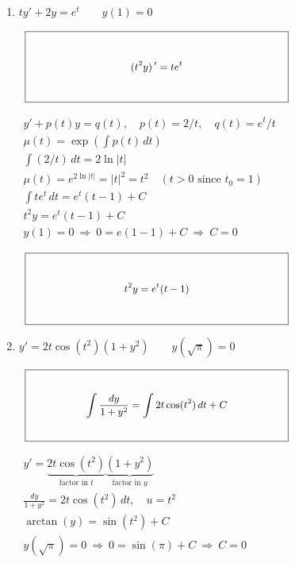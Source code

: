 \documentclass[12pt,letterpaper]{article}
\newcommand{\KeyBox}[3]{%
  \vcenter{\hbox{$\boxed{\parbox[c][#2][c]{#1}{\centering\small
    \setlength{\arraycolsep}{3pt}\renewcommand{\arraystretch}{0.95}%
    \ensuremath{\displaystyle #3}}}$}}}
\begin{document}
\noindent{}%

\begin{enumerate}
\item {}\qquad $ty'+2y=e^t\qquad y(1)=0$

\par\noindent{}\ $\KeyBox{3.2in}{0.80in}{(t^2y)\,{}^{\prime}=t e^t}$\par
{}

\hfill{\footnotesize $\begin{gathered}
y'+p(t)y=q(t),\quad p(t)=2/t,\quad q(t)=e^t/t\\
\mu(t)=\exp\!\left(\int p(t)\,dt\right)\\
\int (2/t)\,dt=2\ln|t|\\
\mu(t)=e^{2\ln|t|}=|t|^2=t^2\quad(t>0\text{ since }t_0=1)\\
\int t e^t\,dt=e^t(t-1)+C\\
t^2y=e^t(t-1)+C\\
y(1)=0\ \Longrightarrow\ 0=e(1-1)+C\ \Longrightarrow\ C=0
\end{gathered}$}
\vfill

\noindent{}\ $\KeyBox{3.2in}{0.80in}{t^2y=e^t(t-1)}$\par
\item {}\qquad $y'=2t\cos(t^2)(1+y^2)\qquad y(\sqrt{\pi})=0$

\par\noindent{}\ $\KeyBox{3.2in}{0.80in}{\displaystyle\int\frac{dy}{1+y^2}=\int 2t\cos(t^2)\,dt+C}$\par
\hfill{\footnotesize $\begin{gathered}
y'=\underbrace{2t\cos(t^2)}_{\text{factor in }t}\underbrace{(1+y^2)}_{\text{factor in }y}\\
\frac{dy}{1+y^2}=2t\cos(t^2)\,dt,\quad u=t^2\\
\arctan(y)=\sin(t^2)+C\\
y(\sqrt{\pi})=0\ \Longrightarrow\ 0=\sin(\pi)+C\ \Longrightarrow\ C=0
\end{gathered}$}
\vfill


\end{enumerate}
\end{document}
